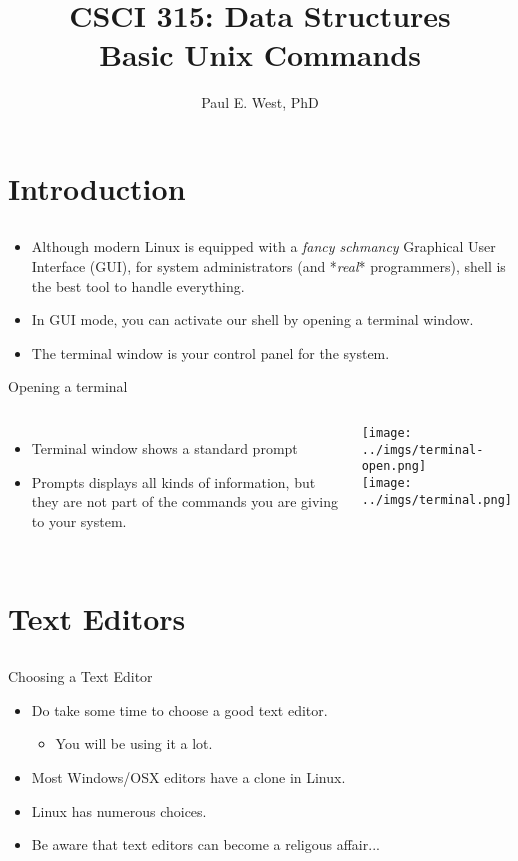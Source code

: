 \documentclass{beamer}
\title{CSCI 315: Data Structures \\ 
    Basic Unix Commands
}
\author{Paul E. West, PhD}
\institute{
  Department of Computer Science\\
  Charleston Southern University
}
\begin{document}
\begin{frame}
  \titlepage
\end{frame}

\section{Introduction}
\subsection{}
\begin{frame}{}
\begin{itemize}
\item Although modern Linux is equipped with a \textit{fancy schmancy} Graphical User Interface (GUI), for system administrators (and *\textit{real}* programmers), shell is the best tool to handle everything.
\item In GUI mode, you can activate our shell by opening a terminal window.
\item The terminal window is your control panel for the system.
\end{itemize}
\end{frame}

\begin{frame}{Opening a terminal}
\begin{columns}[c]
\begin{itemize}
\item Terminal window shows a standard prompt
\item Prompts displays all kinds of information, but they are not part of the commands you are giving to your system.
\end{itemize}
\texttt{[image: ../imgs/terminal-open.png]} \\
\texttt{[image: ../imgs/terminal.png]}
\end{columns}
\end{frame}

\section{Text Editors}
\subsection{}

\begin{frame}{Choosing a Text Editor}
\begin{itemize}
\item Do take some time to choose a good text editor.
\begin{itemize}
\item You will be using it a lot.
\end{itemize}
\item Most Windows/OSX editors have a clone in Linux.
\item Linux has numerous choices.
\item Be aware that text editors can become a religous affair...
\end{itemize}
\end{frame}
\end{document}
